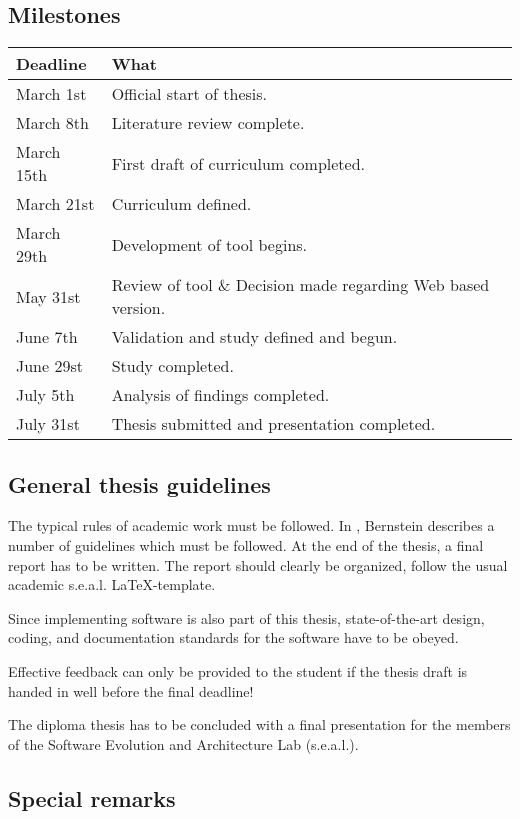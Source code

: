 \documentclass{task_description}
\begin{document}
\subsection*{Milestones}

\begin{tabular}{lp{10cm}}
Deadline & What \\
\hline\noalign{\smallskip}
March 1st & Official start of thesis. \\
March 8th  & Literature review complete. \\
March 15th & First draft of curriculum completed. \\
March 21st & Curriculum defined. \\
March 29th & Development of tool begins. \\
May 31st  & Review of tool \& Decision made regarding Web based version. \\
June 7th & Validation and study defined and begun. \\
June 29st  & Study completed. \\
July 5th  & Analysis of findings completed. \\
July 31st & Thesis submitted and presentation completed. \\
\end{tabular}

\subsection*{General thesis guidelines}

The typical rules of academic work must be followed. In
\cite{Bernstein2005-daguide}, Bernstein describes a number of guidelines which
must be followed. At the end of the thesis, a final report has to be
written. The report should clearly be organized, follow the usual academic
s.e.a.l. \LaTeX-template.

Since implementing software is also part of this thesis, state-of-the-art
design, coding, and documentation standards for the software have to be obeyed.

Effective feedback can only be provided to the student if the thesis draft is handed in well before the final deadline!

The diploma thesis has to be concluded with a final presentation for the members
of the Software Evolution and Architecture Lab (s.e.a.l.).

\subsection*{Special remarks}
\end{document}
